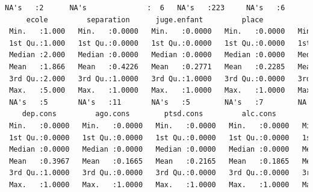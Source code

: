 \begin{lstlisting}[language=html]
 NA's   :2      NA's              :  6   NA's   :223     NA's   :6       NA's   :26                       
     ecole         separation      juge.enfant         place             abus          grav.cons    
 Min.   :1.000   Min.   :0.0000   Min.   :0.0000   Min.   :0.0000   Min.   :0.0000   Min.   :1.000  
 1st Qu.:1.000   1st Qu.:0.0000   1st Qu.:0.0000   1st Qu.:0.0000   1st Qu.:0.0000   1st Qu.:2.000  
 Median :2.000   Median :0.0000   Median :0.0000   Median :0.0000   Median :0.0000   Median :4.000  
 Mean   :1.866   Mean   :0.4226   Mean   :0.2771   Mean   :0.2285   Mean   :0.2778   Mean   :3.643  
 3rd Qu.:2.000   3rd Qu.:1.0000   3rd Qu.:1.0000   3rd Qu.:0.0000   3rd Qu.:1.0000   3rd Qu.:5.000  
 Max.   :5.000   Max.   :1.0000   Max.   :1.0000   Max.   :1.0000   Max.   :1.0000   Max.   :7.000  
 NA's   :5       NA's   :11       NA's   :5        NA's   :7        NA's   :7        NA's   :4      
    dep.cons         ago.cons        ptsd.cons         alc.cons        subst.cons        scz.cons     
 Min.   :0.0000   Min.   :0.0000   Min.   :0.0000   Min.   :0.0000   Min.   :0.0000   Min.   :0.0000  
 1st Qu.:0.0000   1st Qu.:0.0000   1st Qu.:0.0000   1st Qu.:0.0000   1st Qu.:0.0000   1st Qu.:0.0000  
 Median :0.0000   Median :0.0000   Median :0.0000   Median :0.0000   Median :0.0000   Median :0.0000  
 Mean   :0.3967   Mean   :0.1665   Mean   :0.2165   Mean   :0.1865   Mean   :0.2653   Mean   :0.0826  
 3rd Qu.:1.0000   3rd Qu.:0.0000   3rd Qu.:0.0000   3rd Qu.:0.0000   3rd Qu.:1.0000   3rd Qu.:0.0000  
 Max.   :1.0000   Max.   :1.0000   Max.   :1.0000   Max.   :1.0000   Max.   :1.0000   Max.   :1.0000  
                                                                                                      

\end{lstlisting}
